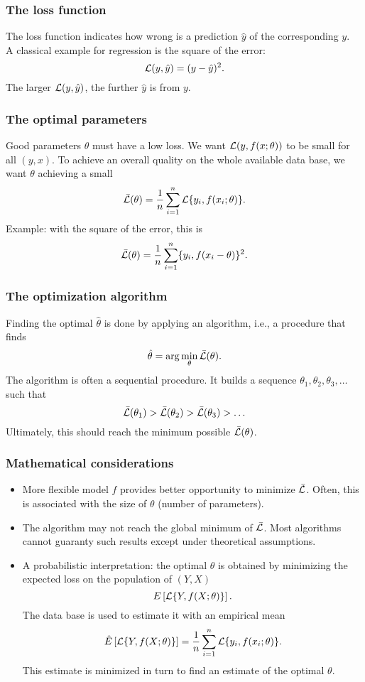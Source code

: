 \begin{frame}
\frametitle{The loss function}
The loss function indicates how wrong is a prediction $\hat{y}$ of the corresponding $y$.\\
\vspace{0.3cm} 
A classical example for regression is the square of the error:
$$
{\cal L}(y,\hat{y}) = (y-\hat{y})^2.
$$ 
The larger ${\cal L}(y,\hat{y})$, the further $\hat{y}$ is from $y$.
\end{frame}
\begin{frame}
\frametitle{The optimal parameters}
Good parameters $\theta$ must have a low loss. We want ${\cal L}(y,f(x;\theta))$ to be small for all $(y,x)$. To achieve an overall quality on the whole available data base, we want $\theta$ achieving a small
$$
\bar{{\cal L}}(\theta) = \frac{1}{n}\sum_{i=1}^n {\cal L}\{y_i, f(x_i;\theta)\}.
$$
Example: with the square of the error, this is 
$$
\bar{{\cal L}}(\theta) = \frac{1}{n}\sum_{i=1}^n \{y_i, f(x_i-\theta)\}^2.
$$
\end{frame}
\begin{frame}
\frametitle{The optimization algorithm}
Finding the optimal $\hat{\theta}$ is done by applying an algorithm, i.e., a procedure that finds 
$$
\hat{\theta} = \arg\min_{\theta} \bar{{\cal L}}(\theta).
$$
The algorithm is often a sequential procedure. It builds a sequence $\theta_1, \theta_2, \theta_3, \ldots$ such that
$$
\bar{{\cal L}}(\theta_1) > \bar{{\cal L}}(\theta_2) > \bar{{\cal L}}(\theta_3) > \ldots 
$$
Ultimately, this should reach the minimum possible $\bar{{\cal L}}(\theta)$.
\end{frame}
\begin{frame}
\frametitle{Mathematical considerations}
\small
\begin{itemize}
\item More flexible model $f$ provides better opportunity to minimize $\bar{{\cal L}}$. Often, this is associated with the size of $\theta$ (number of parameters).
\item The algorithm may not reach the global minimum of $\bar{{\cal L}}$. Most algorithms cannot guaranty such results except under theoretical assumptions.
\item A probabilistic interpretation: the optimal $\theta$ is obtained by minimizing the expected loss on the population of $(Y,X)$
$$
E\left[{\cal L}\{Y, f(X;\theta)\}\right].
$$
The data base is used to estimate it with an empirical mean
$$
\hat{E}\left[{\cal L}\{Y, f(X;\theta)\}\right] = \frac{1}{n}\sum_{i=1}^n {\cal L}\{y_i, f(x_i;\theta)\}.
$$
This estimate is minimized in turn to find an estimate of the optimal $\theta$.
\end{itemize}
\normalsize
\end{frame}



